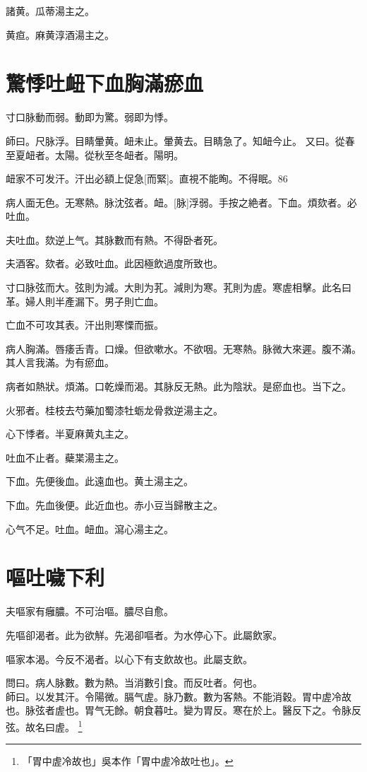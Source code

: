 \documentclass[12pt,twoside,UTF8,b5paper]{ctexbook}
\begin{document}
諸黄。瓜蒂湯主之。

黄疸。麻黄淳酒湯主之。

\chapter{驚悸吐衄下血胸滿瘀血}

寸口脉動而弱。動即为驚。弱即为悸。

師曰。尺脉浮。目睛暈黄。衄未止。暈黄去。目睛急了。知衄今止。
又曰。從春至夏衄者。太陽。從秋至冬衄者。陽明。

衄家不可发汗。汗出必額上促急[而緊]。直視不能眴。不得眠。86

病人面无色。无寒熱。脉沈弦者。衄。[脉]浮弱。手按之絶者。下血。煩欬者。必吐血。

夫吐血。欬逆上气。其脉數而有熱。不得卧者死。

夫酒客。欬者。必致吐血。此因極飲過度所致也。

寸口脉弦而大。弦則为減。大則为芤。減則为寒。芤則为虗。寒虗相擊。此名曰革。婦人則半產漏下。男子則亡血。

亡血不可攻其表。汗出則寒慄而振。

病人胸滿。唇痿舌青。口燥。但欲嗽水。不欲咽。无寒熱。脉微大來遲。腹不滿。其人言我滿。为有瘀血。

病者如熱狀。煩滿。口乾燥而渴。其脉反无熱。此为陰狀。是瘀血也。当下之。

火邪者。桂枝去芍藥加蜀漆牡蛎龙骨救逆湯主之。

心下悸者。半夏麻黄丸主之。

吐血不止者。蘗枼湯主之。

下血。先便後血。此遠血也。黄土湯主之。

下血。先血後便。此近血也。赤小豆当歸散主之。

心气不足。吐血。衄血。瀉心湯主之。

\chapter{嘔吐噦下利}

夫嘔家有癰膿。不可治嘔。膿尽自愈。

先嘔卻渴者。此为欲觧。先渴卻嘔者。为水停心下。此屬飲家。

嘔家本渴。今反不渴者。以心下有支飲故也。此屬支飲。

問曰。病人脉數。數为熱。当消數引食。而反吐者。何也。\\
師曰。以发其汗。令陽微。膈气虗。脉乃數。數为客熱。不能消穀。胃中虗冷故也。脉弦者虗也。胃气无餘。朝食暮吐。變为胃反。寒在於上。醫反下之。令脉反弦。故名曰虗。
	\footnote{「胃中虗冷故也」吳本作「胃中虗冷故吐也」。}
\end{document}

